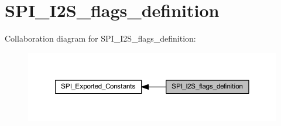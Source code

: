 \hypertarget{group___s_p_i___i2_s__flags__definition}{}\section{S\+P\+I\+\_\+\+I2\+S\+\_\+flags\+\_\+definition}
\label{group___s_p_i___i2_s__flags__definition}
Collaboration diagram for S\+P\+I\+\_\+\+I2\+S\+\_\+flags\+\_\+definition\+:
\nopagebreak
\begin{figure}[H]
\begin{center}
\leavevmode
\includegraphics[width=350pt]{group___s_p_i___i2_s__flags__definition}
\end{center}
\end{figure}
